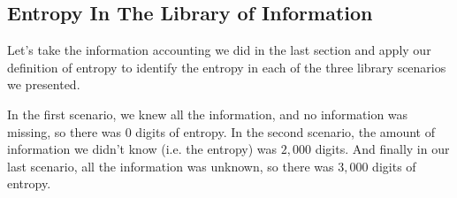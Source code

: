 \documentclass[11pt, oneside]{article}   	%
\begin{document}
\subsection{Entropy In The Library of Information}
Let's take the information accounting we did in the last section and apply our
definition of entropy to identify the entropy in each of the three library
scenarios we presented.

In the first scenario, we knew all the information, and no information was
missing, so there was $0$ digits of entropy.  In the second scenario, the amount
of information we didn't know (i.e. the entropy) was $2,000$ digits.  And
finally in our last scenario, all the information was unknown, so there was
$3,000$ digits of entropy.
\end{document}
